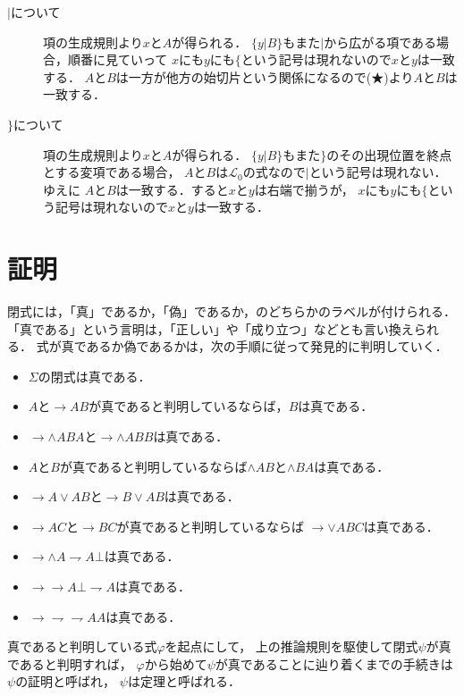 \documentclass[a4j,10.5pt,oneside,openany]{jsbook}
\theoremstyle{mystyle}
\begin{document}
\begin{description}
		\item[$|$について]
			項の生成規則より$x$と$A$が得られる．
			$\{y|B\}$もまた$|$から広がる項である場合，順番に見ていって
			$x$にも$y$にも$\{$という記号は現れないので$x$と$y$は一致する．
			$A$と$B$は一方が他方の始切片という関係になるので(★)より$A$と$B$は一致する．
			
		\item[$\}$について]
			項の生成規則より$x$と$A$が得られる．
			$\{y|B\}$もまた$\}$のその出現位置を終点とする変項である場合，
			$A$と$B$は$\mathcal{L}_{0}$の式なので$|$という記号は現れない．ゆえに
			$A$と$B$は一致する．すると$x$と$y$は右端で揃うが，
			$x$にも$y$にも$\{$という記号は現れないので$x$と$y$は一致する．
	\end{description}

\section{証明}
	閉式には，「真」であるか，「偽」であるか，のどちらかのラベルが付けられる．
	「真である」という言明は，「正しい」や「成り立つ」などとも言い換えられる．
	式が真であるか偽であるかは，次の手順に従って発見的に判明していく．
	
	\begin{itemize}
		\item $\Sigma$の閉式は真である．
		\item $A$と$\rightarrow AB$が真であると判明しているならば，$B$は真である．
		\item $\rightarrow \wedge ABA$と$\rightarrow \wedge ABB$は真である．
		\item $A$と$B$が真であると判明しているならば$\wedge AB$と$\wedge BA$は真である．
		\item $\rightarrow A\vee AB$と$\rightarrow B \vee AB$は真である．
		\item $\rightarrow AC$と$\rightarrow BC$が真であると判明しているならば
			$\rightarrow \vee ABC$は真である．
		\item $\rightarrow\wedge A \rightharpoondown A \bot$は真である．
		\item $\rightarrow \rightarrow A \bot \rightharpoondown A$は真である．
		\item $\rightarrow \rightharpoondown\rightharpoondown AA$は真である．
	\end{itemize}
	
	真であると判明している式$\varphi$を起点にして，
	上の推論規則を駆使して閉式$\psi$が真であると判明すれば，
	$\varphi$から始めて$\psi$が真であることに辿り着くまでの手続きは$\psi$の証明と呼ばれ，
	$\psi$は定理と呼ばれる．
	
\end{document}
